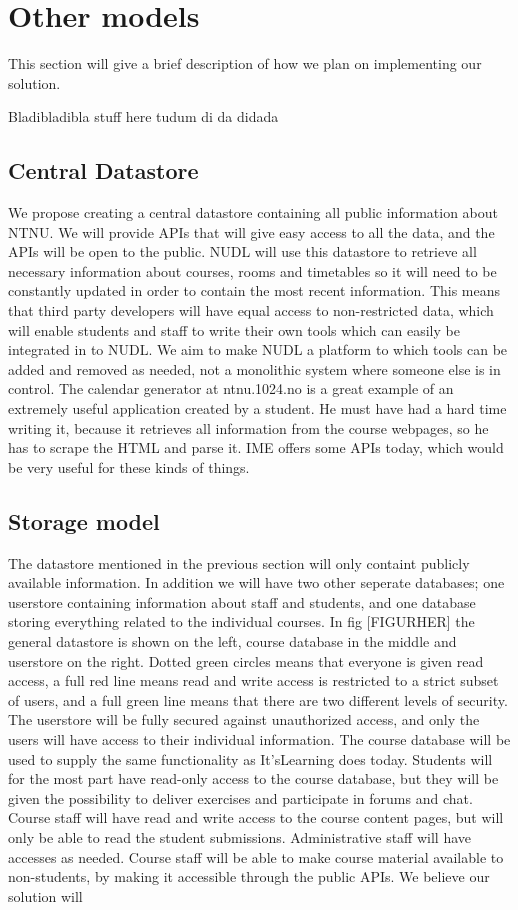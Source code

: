 \section{Other models}
	This section will give a brief description of how we plan on implementing our solution. 
	
	Bladibladibla stuff here tudum di da didada
	
	\subsection{Central Datastore}
		We propose creating a central datastore containing all public information about NTNU. We will provide APIs that will give easy access to all the data, and the APIs will be open to the public. 
NUDL will use this datastore to retrieve all necessary information about courses, rooms and timetables so it will need to be constantly updated in order to contain the most recent information. This means that third party developers will have equal access to non-restricted data, which will enable students and staff to write their own tools which can easily be integrated in to NUDL. We aim to make NUDL a platform to which tools can be added and removed as needed, not a monolithic system where someone else is in control. The calendar generator at ntnu.1024.no is a great example of an extremely useful application created by a student. He must have had a hard time writing it, because it retrieves all information from the course webpages, so he has to scrape the HTML and parse it. IME offers some APIs today, which would be very useful for these kinds of things.

	\subsection{Storage model}
		The datastore mentioned in the previous section will only containt publicly available information. In addition we will have two other seperate databases; one userstore containing information about staff and students, and one database storing everything related to the individual courses. In fig [FIGURHER] the general datastore is shown on the left, course database in the middle and userstore on the right. Dotted green circles means that everyone is given read access, a full red line means read and write access is restricted to a strict subset of users, and a full green line means that there are two different levels of security. The userstore will be fully secured against unauthorized access, and only the users will have access to their individual information. The course database will be used to supply the same functionality as It'sLearning does today. Students will for the most part have read-only access to the course database, but they will be given the possibility to deliver exercises and participate in forums and chat. Course staff will have read and write access to the course content pages, but will only be able to read the student submissions. Administrative staff will have accesses as needed. 
Course staff will be able to make course material available to non-students, by making it accessible through the public APIs. We believe our solution will 
		
